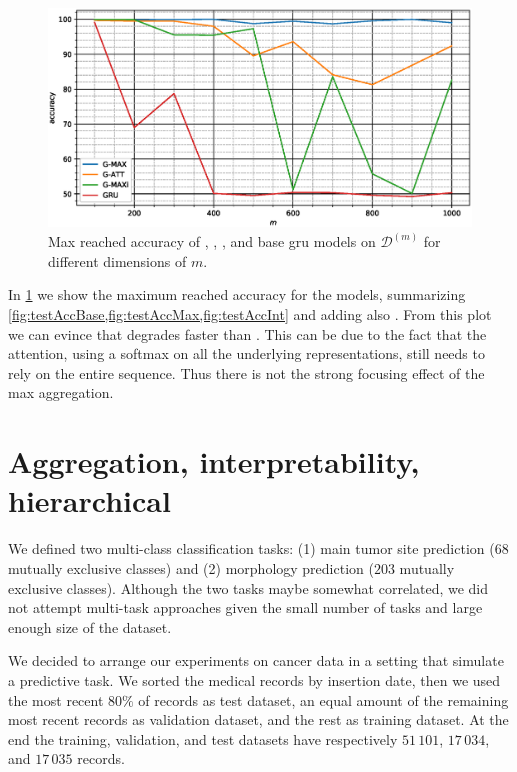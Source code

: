 \begin{figure}
  \centering
  \includegraphics[width=\floatwidth]{imgMax/maxBaseDiff.eps}
  \caption{Max reached accuracy of \maxp{}, \softmax{}, \maxi{}, and
    base \ac{gru} models on
    $\mathcal{D}^{(m)}$ for different dimensions of $m$.} 
  \label{fig:testAccDiff}
\end{figure}
In \cref{fig:testAccDiff} we show the maximum reached accuracy for the
models, summarizing
\cref{fig:testAccBase,fig:testAccMax,fig:testAccInt} and adding also
\softmax{}. From this plot we can evince that \softmax{} degrades
faster than \maxp{}. This can be due to the fact that the attention,
using a softmax on all the underlying representations,
still needs to rely on the entire sequence. Thus there is not the
strong focusing effect of the max aggregation.


\section{Aggregation, interpretability,
  hierarchical}
\label{ch:icdo}

We defined two multi-class classification tasks: (1) main tumor site
prediction ($68$ mutually exclusive classes) and (2) morphology
prediction ($203$ mutually exclusive
classes). Although the two tasks maybe somewhat correlated, we did not
attempt multi-task approaches given the small number of tasks and
large enough size of the dataset.

We decided to arrange our experiments on cancer
data in 
a setting that simulate a predictive task. We sorted the medical
records by insertion date, then we used the most recent $80\%$ of
records as test 
dataset, an equal amount of the remaining most recent records as
validation dataset, and the rest as training dataset. At the end the
training, validation, and test datasets have respectively $51\,101$,
$17\,034$, and $17\,035$ records.

